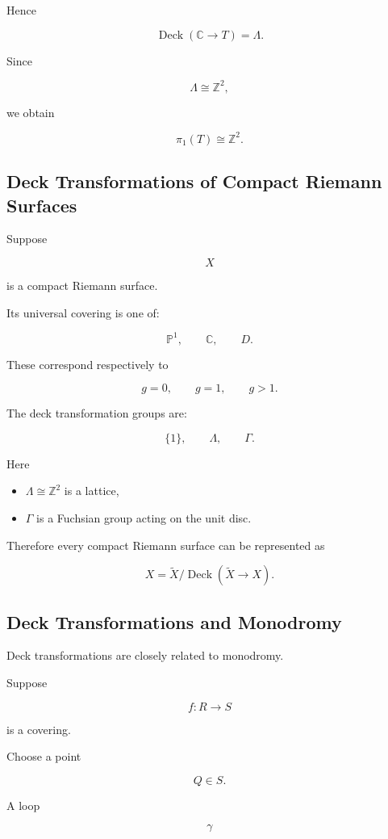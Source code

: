 \documentclass[12pt,a4paper]{article}
\theoremstyle{notespace}
\begin{document}
Hence

\[
\operatorname{Deck}(\mathbb C\to T)
=
\Lambda.
\]

Since

\[
\Lambda\cong\mathbb Z^2,
\]

we obtain

\[
\pi_1(T)
\cong
\mathbb Z^2.
\]

\subsection{Deck Transformations of Compact Riemann Surfaces}

Suppose

\[
X
\]

is a compact Riemann surface.

Its universal covering is one of:

\[
\mathbb P^1,
\qquad
\mathbb C,
\qquad
D.
\]

These correspond respectively to

\[
g=0,
\qquad
g=1,
\qquad
g>1.
\]

The deck transformation groups are:

\[
\{1\},
\qquad
\Lambda,
\qquad
\Gamma.
\]

Here

\begin{itemize}
	\item \(\Lambda\cong\mathbb Z^2\) is a lattice,
	\item \(\Gamma\) is a Fuchsian group acting on the unit disc.
\end{itemize}

Therefore every compact Riemann surface can be represented as

\[
X
=
\widetilde X/\operatorname{Deck}(\widetilde X\to X).
\]

\subsection{Deck Transformations and Monodromy}

Deck transformations are closely related to monodromy.

Suppose

\[
f:R\to S
\]

is a covering.

Choose a point

\[
Q\in S.
\]

A loop

\[
\gamma
\]
\end{document}
